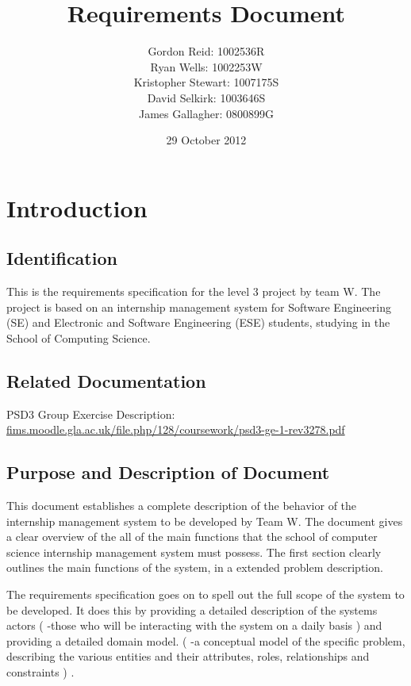 \documentclass{l3deliverable}
\title{Requirements Document}
\author{
    Gordon Reid: 1002536R\\
    Ryan Wells: 1002253W\\
    Kristopher Stewart: 1007175S\\
    David Selkirk: 1003646S\\
    James Gallagher: 0800899G\\
}
\date{29 October 2012}
\begin{document}

\maketitle

\tableofcontents

\newpage


\section{Introduction}




\subsection{Identification}

This is the requirements specification for the level 3 project by team W. The project is based on an internship management system for Software Engineering (SE) and Electronic and Software Engineering (ESE) students, studying in the School of Computing Science.


\subsection{Related Documentation}

PSD3 Group Exercise Description:\\
\url{fims.moodle.gla.ac.uk/file.php/128/coursework/psd3-ge-1-rev3278.pdf}

\subsection{Purpose and Description of Document}

This document establishes a complete description of the behavior of the internship management system to be developed by Team W. The document gives a clear overview of the all of the main functions that the school of computer science internship management system must possess. The first section clearly outlines the main functions of the system, in a extended problem description.  


The requirements specification goes on to spell out the full scope of the system to be developed. It does this by providing a detailed description of the systems actors ( -those who will be interacting with the system on a daily basis ) and providing a detailed domain model. ( -a conceptual model of the specific problem, describing the various entities and their attributes, roles, relationships and constraints ) . 
\end{document}
